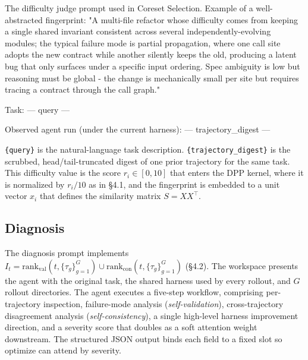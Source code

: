 \documentclass{llmxive}
\begin{document}
\begin{promptbox}{The difficulty judge prompt used in Coreset Selection.}
Example of a well-abstracted fingerprint:
  "A multi-file refactor whose difficulty comes from keeping a single
  shared invariant consistent across several independently-evolving
  modules; the typical failure mode is partial propagation, where one
  call site adopts the new contract while another silently keeps the
  old, producing a latent bug that only surfaces under a specific
  input ordering. Spec ambiguity is low but reasoning must be global -
  the change is mechanically small per site but requires tracing a
  contract through the call graph."

Task:
---
{query}
---

Observed agent run (under the current harness):
---
{trajectory_digest}
---
\end{promptbox}

\noindent\texttt{\{query\}} is the natural-language task description.
\texttt{\{trajectory\_digest\}} is the scrubbed, head/tail-truncated
digest of one prior trajectory for the same task. This difficulty
value is the score $r_i \in [0,10]$ that enters the DPP
kernel, where it is normalized by $r_i/10$ as in \S 4.1, and the
fingerprint is embedded to a unit vector $x_i$ that defines the
similarity matrix $S = X X^\top$.

\subsection{Diagnosis}

The diagnosis prompt implements
$I_t = \mathrm{rank}_{\mathrm{val}}(t, \{\tau_g\}_{g=1}^{G}) \cup \mathrm{rank}_{\mathrm{con}}(t, \{\tau_g\}_{g=1}^{G})$ (\S 4.2). The
workspace presents the agent with the original task, the shared
harness used by every rollout, and $G$ rollout directories. The agent
executes a five-step workflow, comprising per-trajectory inspection, failure-mode
analysis (\emph{self-validation}), cross-trajectory disagreement
analysis (\emph{self-consistency}), a single high-level harness
improvement direction, and a severity score that doubles as a soft
attention weight downstream. The structured JSON output binds each
field to a fixed slot so $\mathrm{optimize}$ can attend by severity.
\end{document}

